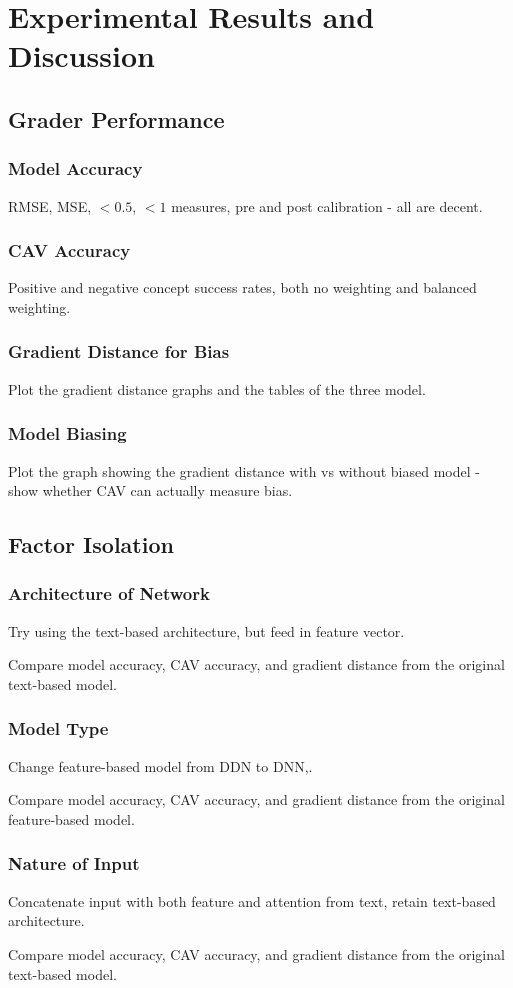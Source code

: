\chapter{Experimental Results and Discussion} \label{chap:results}

\section{Grader Performance}
\subsection{Model Accuracy}
RMSE, MSE, $<0.5$, $<1$ measures, pre and post calibration - all are decent.

\subsection{CAV Accuracy}

Positive and negative concept success rates, both no weighting and balanced weighting.

\subsection{Gradient Distance for Bias}

Plot the gradient distance graphs and the tables of the three model.

\subsection{Model Biasing}
Plot the graph showing the gradient distance with vs without biased model - show whether CAV can actually measure bias.

\section{Factor Isolation}
\subsection{Architecture of Network}
Try using the text-based architecture, but feed in feature vector.

Compare model accuracy, CAV accuracy, and gradient distance from the original text-based model.

\subsection{Model Type}
Change feature-based model from DDN to DNN,.

Compare model accuracy, CAV accuracy, and gradient distance from the original feature-based model.

\subsection{Nature of Input}
Concatenate input with both feature and attention from text, retain text-based architecture.

Compare model accuracy, CAV accuracy, and gradient distance from the original text-based model.